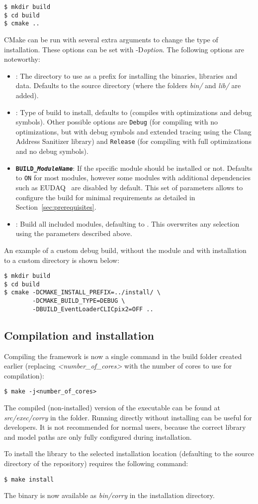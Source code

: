 \begin{verbatim}
$ mkdir build
$ cd build
$ cmake ..
\end{verbatim}

CMake can be run with several extra arguments to change the type of installation.
These options can be set with -D\textit{option}.
The following options are noteworthy:
\begin{itemize}
\item {}: The directory to use as a prefix for installing the binaries, libraries and data.
Defaults to the source directory (where the folders \textit{bin/} and \textit{lib/} are added).
\item {}: Type of build to install, defaults to  (compiles with optimizations and debug symbols).
Other possible options are \texttt{Debug} (for compiling with no optimizations, but with debug symbols and extended tracing using the Clang Address Sanitizer library) and \texttt{Release} (for compiling with full optimizations and no debug symbols).
\item \textbf{\texttt{BUILD\_\textit{ModuleName}}}: If the specific module  should be installed or not.
Defaults to \texttt{ON} for most modules, however some modules with additional dependencies such as EUDAQ~\cite{eudaq} are disabled by default.
This set of parameters allows to configure the build for minimal requirements as detailed in Section~\ref{sec:prerequisites}.
\item {}: Build all included modules, defaulting to .
This overwrites any selection using the parameters described above.
\end{itemize}

An example of a custom debug build, without the  module and with installation to a custom directory is shown below:
\begin{verbatim}
$ mkdir build
$ cd build
$ cmake -DCMAKE_INSTALL_PREFIX=../install/ \
        -DCMAKE_BUILD_TYPE=DEBUG \
        -DBUILD_EventLoaderCLICpix2=OFF ..
\end{verbatim}

\subsection{Compilation and installation}
Compiling the framework is now a single command in the build folder created earlier (replacing \textit{\textless number\_of\_cores\textgreater} with the number of cores to use for compilation):
\begin{verbatim}
$ make -j<number_of_cores>
\end{verbatim}
The compiled (non-installed) version of the executable can be found at \textit{src/exec/corry} in the  folder.
Running \corry directly without installing can be useful for developers.
It is not recommended for normal users, because the correct library and model paths are only fully configured during installation.

To install the library to the selected installation location (defaulting to the source directory of the repository) requires the following command:
\begin{verbatim}
$ make install
\end{verbatim}

The binary is now available as \textit{bin/corry} in the installation directory.
